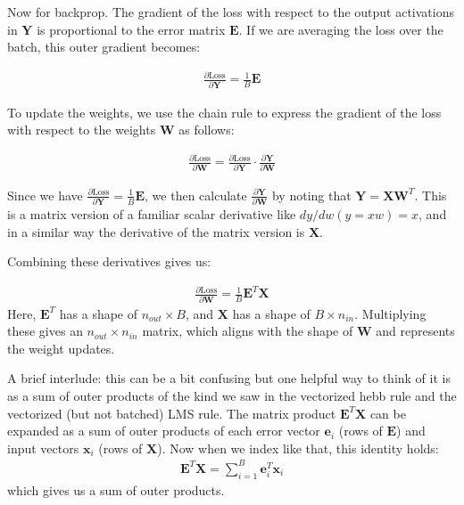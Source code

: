 Now for backprop. The gradient of the loss with respect to the output activations in $\mathbf{Y}$ is proportional to the error matrix $\mathbf{E}$. If we are averaging the loss over the batch, this outer gradient becomes:

\begin{eqnarray}
\frac{\partial \text{Loss}}{\partial \mathbf{Y}} = \frac{1}{B} \mathbf{E}
\end{eqnarray}

To update the weights, we use the chain rule to express the gradient of the loss with respect to the weights $\mathbf{W}$ as follows:

\begin{eqnarray}
\frac{\partial \text{Loss}}{\partial \mathbf{W}} = \frac{\partial \text{Loss}}{\partial \mathbf{Y}} \cdot \frac{\partial \mathbf{Y}}{\partial \mathbf{W}}
\end{eqnarray}

Since we have $\frac{\partial \text{Loss}}{\partial \mathbf{Y}} = \frac{1}{B} \mathbf{E}$, we then calculate $\frac{\partial \mathbf{Y}}{\partial \mathbf{W}}$ by noting that $\mathbf{Y} = \mathbf{X} \mathbf{W}^T$. This is a matrix version of a familiar scalar derivative like $dy/dw(y = xw) = x$, and in a similar way the derivative of the matrix version is $\mathbf{X}$. 

Combining these derivatives gives us:

\begin{eqnarray}
\frac{\partial \text{Loss}}{\partial \mathbf{W}} = \frac{1}{B} \mathbf{E}^T \mathbf{X}
\end{eqnarray}
Here, $\mathbf{E}^T$ has a shape of $n_{out} \times B$, and $\mathbf{X}$ has a shape of $B \times n_{in}$. Multiplying these gives an $n_{out} \times n_{in}$ matrix, which aligns with the shape of $\mathbf{W}$ and represents the weight updates.

A brief interlude: this can be a bit confusing but one helpful way to think of it is as a sum of outer products of the kind we saw in the vectorized hebb rule and the vectorized (but not batched) LMS rule. The matrix product $\mathbf{E}^T \mathbf{X}$ can be expanded as a sum of outer products of each error vector $\mathbf{e}_i$ (rows of $\mathbf{E}$) and input vectors $\mathbf{x}_i$ (rows of $\mathbf{X}$). Now when we index like that, this identity holds:
\begin{eqnarray}
\mathbf{E}^T \mathbf{X} = \sum_{i=1}^{B} \mathbf{e}_i^T \mathbf{x}_i
\end{eqnarray}
which gives us a sum of outer products.

